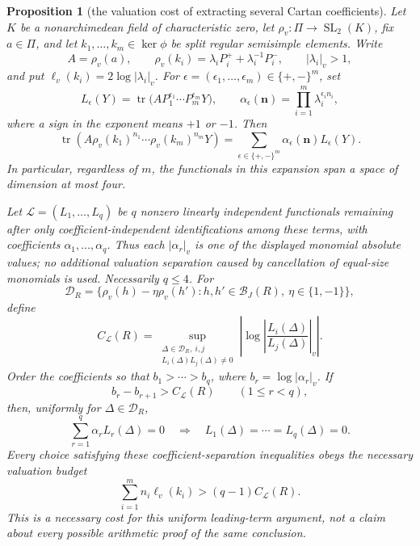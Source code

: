 \documentclass[11pt,reqno]{amsart}
\newtheorem{proposition}[theorem]{Proposition}
\theoremstyle{definition}
\theoremstyle{remark}
\newcommand{\Tr}{\operatorname{tr}}
\newcommand{\SL}{\operatorname{SL}}
\begin{document}
\begin{proposition}[the valuation cost of extracting several Cartan coefficients]
\label{prop:multi-cartan-budget}
Let \(K\) be a nonarchimedean field of characteristic zero, let
\(\rho_v\colon\Pi\to\SL_2(K)\), fix \(a\in\Pi\), and let
\(k_1,\ldots,k_m\in\ker\phi\) be split regular semisimple elements.  Write
\[
 A=\rho_v(a),\qquad
 \rho_v(k_i)=\lambda_iP_i^++\lambda_i^{-1}P_i^-,
 \qquad |\lambda_i|_v>1,
\]
and put \(\ell_v(k_i)=2\log|\lambda_i|_v\).  For
\(\epsilon=(\epsilon_1,\ldots,\epsilon_m)\in\{+,-\}^m\), set
\[
 L_\epsilon(Y)=
 \Tr\bigl(AP_1^{\epsilon_1}\cdots P_m^{\epsilon_m}Y\bigr),
 \qquad
 \alpha_\epsilon(\mathbf n)=
 \prod_{i=1}^m\lambda_i^{\epsilon_i n_i},
\]
where a sign in the exponent means \(+1\) or \(-1\).  Then
\[
 \Tr\!\left(
 A\rho_v(k_1)^{n_1}\cdots\rho_v(k_m)^{n_m}Y\right)
 =
 \sum_{\epsilon\in\{+,-\}^m}
 \alpha_\epsilon(\mathbf n)L_\epsilon(Y).
\]
In particular, regardless of \(m\), the functionals in this expansion span
a space of dimension at most four.

Let \(\mathcal L=(L_1,\ldots,L_q)\) be \(q\) nonzero linearly independent
functionals remaining after only coefficient-independent identifications
among these terms, with coefficients
\(\alpha_1,\ldots,\alpha_q\).  Thus each
\(|\alpha_r|_v\) is one of the displayed monomial absolute values; no
additional valuation separation caused by cancellation of equal-size
monomials is used.  Necessarily \(q\le4\).  For
\[
 \mathcal D_R=\{\rho_v(h)-\eta\rho_v(h'):
   h,h'\in\mathcal B_J(R),\ \eta\in\{1,-1\}\},
\]
define
\[
 C_{\mathcal L}(R)=
 \sup_{\substack{\Delta\in\mathcal D_R,\ i,j\\
                   L_i(\Delta)L_j(\Delta)\ne0}}
 \left|\log\left|\frac{L_i(\Delta)}{L_j(\Delta)}\right|_v\right|.
\]
Order the coefficients so that
\(b_1>\cdots>b_q\), where \(b_r=\log|\alpha_r|_v\).  If
\[
 b_r-b_{r+1}>C_{\mathcal L}(R)\qquad(1\le r<q),
\]
then, uniformly for \(\Delta\in\mathcal D_R\),
\[
 \sum_{r=1}^q\alpha_rL_r(\Delta)=0
 \quad\Longrightarrow\quad
 L_1(\Delta)=\cdots=L_q(\Delta)=0.
\]
Every choice satisfying these coefficient-separation inequalities obeys
the necessary valuation budget
\[
 \sum_{i=1}^m n_i\ell_v(k_i)>
 (q-1)C_{\mathcal L}(R).
\]
This is a necessary cost for this uniform leading-term argument, not a
claim about every possible arithmetic proof of the same conclusion.
\end{proposition}
\end{document}
